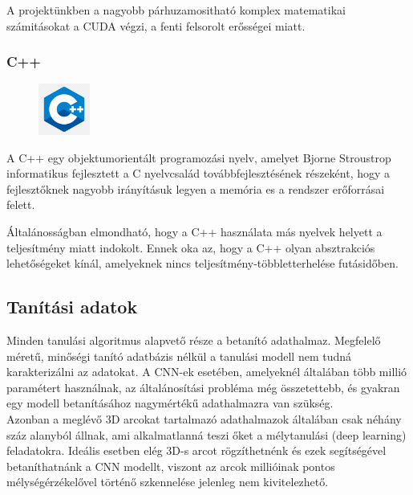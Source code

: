 \documentclass[12pt,a4]{article}
\begin{document}
	A projektünkben a nagyobb párhuzamositható komplex matematikai számitásokat a CUDA végzi, a fenti felsorolt erősségei miatt.

	\newpage
	
	\vspace{-15pt} \leavevmode\subsubsection{C++}
	\setlength\intextsep{12pt}
	\begin{figure}
		\centering
		\includegraphics[width=0.15\textwidth]{cpp}
	\end{figure}

	A C++ egy objektumorientált programozási nyelv, amelyet Bjorne Stroustrop informatikus fejlesztett a C nyelvcsalád továbbfejlesztésének részeként, hogy a fejlesztőknek nagyobb irányításuk legyen a memória es a rendszer erőforrásai felett.
	
	Általánosságban elmondható, hogy a C++ használata más nyelvek helyett a teljesítmény miatt indokolt. Ennek oka az, hogy a C++ olyan absztrakciós lehetőségeket kínál, amelyeknek nincs teljesítmény-többletterhelése futásidőben.

	\vspace{-15pt} \leavevmode\subsection{Tanítási adatok}
	Minden tanulási algoritmus alapvető része a betanító adathalmaz.
	Megfelelő méretű, minőségi tanító adatbázis nélkül a tanulási modell nem tudná karakterizálni az adatokat.
	A CNN-ek esetében, amelyeknél általában több millió paramétert használnak, az általánosítási probléma még összetettebb, és gyakran egy modell betanításához nagymértékű adathalmazra van szükség. \\
	
	Azonban a meglévő 3D arcokat tartalmazó adathalmazok általában csak néhány száz alanyból állnak, ami alkalmatlanná
	teszi őket a mélytanulási (deep learning) feladatokra.
	Ideális esetben elég 3D-s arcot rögzíthetnénk és ezek segítségével betaníthatnánk a CNN modellt, viszont az arcok
	millióinak pontos mélységérzékelővel történő szkennelése jelenleg nem kivitelezhető. 
	
\end{document}
